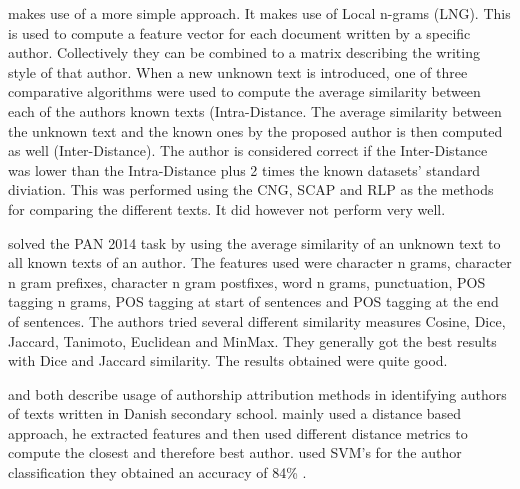 \cite{layton:2014} makes use of a more simple approach. It makes use of Local
n-grams (LNG). This is used to compute a feature vector for each document
written by a specific author. Collectively they can be combined to a matrix
describing the writing style of that author. When a new unknown text is
introduced, one of three comparative algorithms were used to compute the average
similarity between each of the authors known texts (Intra-Distance. The average
similarity between the unknown text and the known ones by the proposed author is
then computed as well (Inter-Distance). The author is considered correct if
the Inter-Distance was lower than the Intra-Distance plus 2 times the known
datasets' standard diviation. This was performed using the CNG, SCAP and RLP as
the methods for comparing the different texts. It did however not perform very
well.

\cite{castro2015} solved the PAN 2014 task by using the average similarity of an
unknown text to all known texts of an author. The features used were character n
grams, character n gram prefixes, character n gram postfixes, word n grams,
punctuation, \gls{POS} tagging n grams, \gls{POS} tagging at start of sentences
and \gls{POS} tagging at the end of sentences. The authors tried several
different similarity measures Cosine, Dice, Jaccard, Tanimoto, Euclidean and
MinMax. They generally got the best results with Dice and Jaccard similarity.
The results obtained were quite good.

\cite{hansen2014} and \cite{aalykke2016} both describe usage of authorship
attribution methods in identifying authors of texts written in Danish secondary
school. \cite{aalykke2016} mainly used a distance based approach, he extracted
features and then used different distance metrics to compute the closest and
therefore best author. \cite{hansen2014} used SVM's for the author
classification they obtained an accuracy of 84\% .
